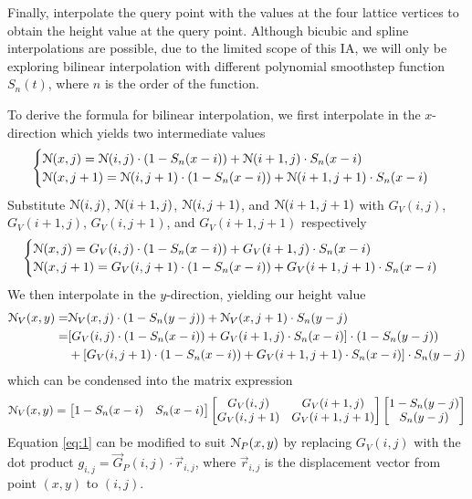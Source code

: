 Finally, interpolate the query point with the values at the four lattice vertices to obtain the height value at the query point. Although
bicubic and spline interpolations are possible, due to the limited scope of this IA, we will only be exploring bilinear interpolation with 
different polynomial smoothstep function $S_n(t)$, where $n$ is the order of the function. 

To derive the formula for bilinear interpolation, we first interpolate in the $x$-direction which yields two intermediate values
\begin{align*}
    \begin{cases}
        \EuScript{N}(x,j)=\EuScript{N}(i,j)\cdot(1-S_n(x-i))+\EuScript{N}(i+1,j)\cdot S_n(x-i)\\
        \EuScript{N}(x,j+1)=\EuScript{N}(i,j+1)\cdot(1-S_n(x-i))+\EuScript{N}(i+1,j+1)\cdot S_n(x-i)
    \end{cases}
\end{align*}
Substitute $\EuScript{N}(i,j)$, $\EuScript{N}(i+1,j)$, $\EuScript{N}(i,j+1)$, and $\EuScript{N}(i+1,j+1)$ with $G_V(i,j)$, $G_V(i+1,j)$,
$G_V(i,j+1)$, and $G_V(i+1,j+1)$ respectively
\begin{align*}
    \begin{cases}
        \EuScript{N}(x,j)=G_V(i,j)\cdot(1-S_n(x-i))+G_V(i+1,j)\cdot S_n(x-i)\\
        \EuScript{N}(x,j+1)=G_V(i,j+1)\cdot(1-S_n(x-i))+G_V(i+1,j+1)\cdot S_n(x-i)
    \end{cases}
\end{align*}
We then interpolate in the $y$-direction, yielding our height value
\begin{align*}
    \EuScript{N}_V(x,y)=&\EuScript{N}_V(x,j)\cdot(1-S_n(y-j))+\EuScript{N}_V(x,j+1)\cdot S_n(y-j) \\
    =&[G_V(i,j)\cdot(1-S_n(x-i))+G_V(i+1,j)\cdot S_n(x-i)]\cdot(1-S_n(y-j))\\
    &+[G_V(i,j+1)\cdot(1-S_n(x-i))+G_V(i+1,j+1)\cdot S_n(x-i)]\cdot S_n(y-j)
\end{align*}
which can be condensed into the matrix expression
\begin{equation} \label{eq:1}
    \EuScript{N}_V(x,y)=
    \begin{bmatrix}
        1-S_n(x-i) & S_n(x-i)
    \end{bmatrix}
    \begin{bmatrix}
        G_V(i,j) & G_V(i+1,j)\\
        G_V(i,j+1) & G_V(i+1,j+1)
    \end{bmatrix}
    \begin{bmatrix}
        1-S_n(y-j)\\
        S_n(y-j)
    \end{bmatrix}
\end{equation}
Equation \ref{eq:1} can be modified to suit $\EuScript{N}_P(x,y)$ by replacing $G_V(i,j)$ with the
dot product $g_{i,j}=\vec{G}_P(i,j)\cdot \vec{r}_{i,j}$, where $\vec{r}_{i,j}$ is the displacement vector from
point $(x,y)$ to $(i,j)$.

